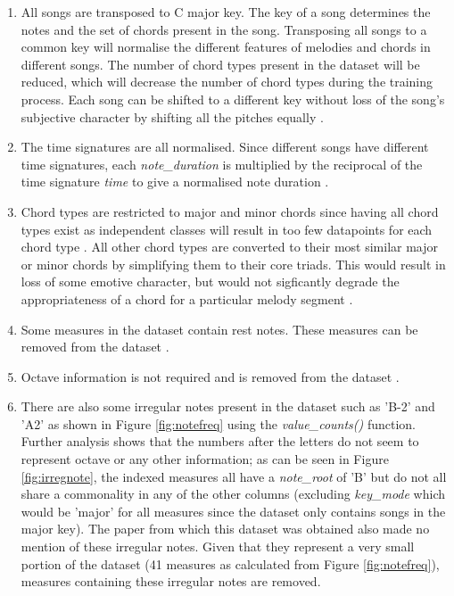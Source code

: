 \begin{enumerate}
  \item All songs are transposed to C major key. The key of a song determines the notes and the set of chords present in the song. Transposing all songs to a common key will normalise the different features of melodies and chords in different songs. The number of chord types present in the dataset will be reduced, which will decrease the number of chord types during the training process. Each song can be shifted to a different key without loss of the song's subjective character by shifting all the pitches equally \cite{MySong} \cite{MLForChords} \cite{BLSTM}.
  \item The time signatures are all normalised. Since different songs have different time signatures, each \emph{note\_duration} is multiplied by the reciprocal of the time signature \emph{time} to give a normalised note duration \cite{BLSTM}.
  \item Chord types are restricted to major and minor chords since having all chord types exist as independent classes will result in too few datapoints for each chord type \cite{BLSTM}. All other chord types are converted to their most similar major or minor chords by simplifying them to their core triads. This would result in loss of some emotive character, but would not sigficantly degrade the appropriateness of a chord for a particular melody segment \cite{MySong}.
  \item Some measures in the dataset contain rest notes. These measures can be removed from the dataset \cite{MLForChords}.
  \item Octave information is not required and is removed from the dataset \cite{BLSTM}.
  \item There are also some irregular notes present in the dataset such as 'B-2' and 'A2' as shown in Figure \ref{fig:notefreq} using the \emph{value\_counts()} function. Further analysis shows that the numbers after the letters do not seem to represent octave or any other information; as can be seen in Figure \ref{fig:irregnote}, the indexed measures all have a \emph{note\_root} of 'B' but do not all share a commonality in any of the other columns (excluding \emph{key\_mode} which would be 'major' for all measures since the dataset only contains songs in the major key). The paper from which this dataset was obtained also made no mention of these irregular notes. Given that they represent a very small portion of the dataset (41 measures as calculated from Figure \ref{fig:notefreq}), measures containing these irregular notes are removed.
\end{enumerate}

